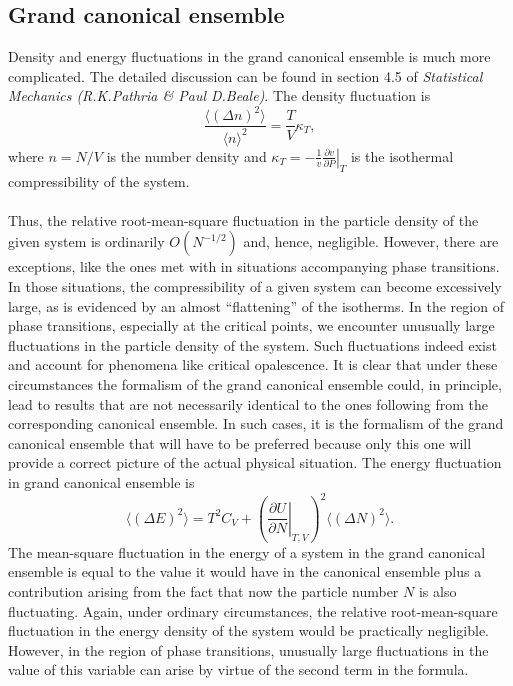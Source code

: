 \subsection{Grand canonical ensemble}
Density and energy fluctuations in the grand canonical ensemble is much more complicated. The detailed discussion can be found in section 4.5 of \emph{Statistical Mechanics (R.K.Pathria \& Paul D.Beale)}. 
The density fluctuation is
\[\frac{\langle (\Delta n)^2 \rangle}{\langle n \rangle^2} = \frac{T}{V}\kappa_T,\]
where $ n = {N}/{V}$ is the number density and $\kappa_T = -\frac{1}{v} \left. \frac{\partial v}{\partial P} \right|_{T}$ is the isothermal compressibility of the system.
\\ \\
Thus, the relative root-mean-square fluctuation in the particle density of the given system is ordinarily $O(N^{-1/2})$ and, hence, negligible. However, there are exceptions, like the ones met with in situations accompanying phase transitions. In those situations, the compressibility of a given system can become excessively large, as is evidenced by an almost ``flattening'' of the isotherms. In the region of phase transitions, especially at the critical points, we encounter unusually large fluctuations in the particle density of the system. Such fluctuations indeed exist and account for phenomena like critical opalescence. It is clear that under these circumstances the formalism of the grand canonical ensemble could, in principle, lead to results that are not necessarily identical to the ones following from the corresponding canonical ensemble. In such cases, it is the formalism of the grand canonical ensemble that will have to be preferred because only this one will provide a correct picture of the actual physical situation.
The energy fluctuation in grand canonical ensemble is 
\[\langle (\Delta E)^2 \rangle = T^2C_V + \left(\left. \frac{\partial U}{\partial N} \right|_{T,V} \right)^2 \langle (\Delta N)^2 \rangle.\]
The mean-square fluctuation in the energy of a system in the grand canonical ensemble is equal to the value it would have in the canonical ensemble plus a contribution arising from the fact that now the particle number $N$ is also fluctuating. Again, under ordinary circumstances, the relative root-mean-square fluctuation in the energy density of the system would be practically negligible. However, in the region of phase transitions, unusually large fluctuations in the value of this variable can arise by virtue of the second term in the formula.

